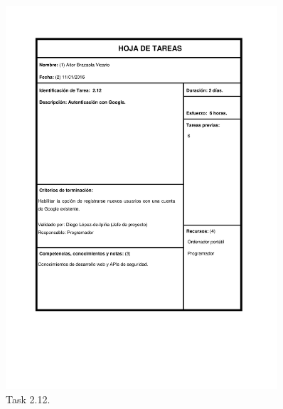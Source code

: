 \documentclass{DeustoFDP}
\begin{document}
\begin{figure}[H]
	\centering
	\includegraphics[width=0.9\textwidth]{fig/Tareas/212}
	\caption{Task 2.12.}
	\label{fig:t212}
\end{figure}
\end{document}
